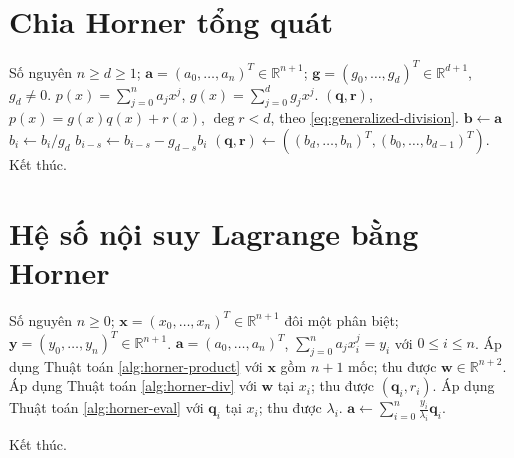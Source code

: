\documentclass[12pt,a4paper,oneside]{book}
\numberwithin{algorithm}{chapter}
\theoremstyle{definition}
\newcommand{\R}{\mathbb{R}}
\begin{document}
\section{Chia Horner tổng quát}
\begin{algorithm}[H]
\caption{Chia đa thức bằng Horner tổng quát}
\label{alg:generalized-horner-div}
\begin{algorithmic}[1]
\Require Số nguyên $n\geq d\geq1$; $\boldsymbol a=(a_0,\ldots,a_n)^T\in\R^{n+1}$; $\boldsymbol g=(g_0,\ldots,g_d)^T\in\R^{d+1}$, $g_d\ne0$. $p(x)=\sum_{j=0}^{n}a_jx^j$, $g(x)=\sum_{j=0}^{d}g_jx^j$.
\Ensure $(\boldsymbol q,\boldsymbol r)$, $p(x)=g(x)q(x)+r(x)$, $\deg r<d$, theo \eqref{eq:generalized-division}.
\State $\boldsymbol b\gets\boldsymbol a$
  \State $b_i\gets b_i/g_d$
    \State $b_{i-s}\gets b_{i-s}-g_{d-s}b_i$
  \EndFor
\EndFor
\Statex
\State $(\boldsymbol q,\boldsymbol r)\gets((b_d,\ldots,b_n)^T,(b_0,\ldots,b_{d-1})^T)$.
\State Kết thúc.
\end{algorithmic}
\end{algorithm}

\section{Hệ số nội suy Lagrange bằng Horner}
\begin{algorithm}[H]
\caption{Tạo hệ số nội suy Lagrange bằng Horner -- sơ lược}
\label{alg:lagrange-coefficients}
\begin{algorithmic}[1]
\Require Số nguyên $n\geq0$; $\boldsymbol x=(x_0,\ldots,x_n)^T\in\R^{n+1}$ đôi một phân biệt; $\boldsymbol y=(y_0,\ldots,y_n)^T\in\R^{n+1}$.
\Ensure $\boldsymbol a=(a_0,\ldots,a_n)^T$, $\sum_{j=0}^{n}a_jx_i^j=y_i$ với $0\leq i\leq n$.
\State Áp dụng Thuật toán \ref{alg:horner-product} với $\boldsymbol x$ gồm $n+1$ mốc; thu được $\boldsymbol w\in\R^{n+2}$.
  \State Áp dụng Thuật toán \ref{alg:horner-div} với $\boldsymbol w$ tại $x_i$; thu được $(\boldsymbol q_i,r_i)$.
  \State Áp dụng Thuật toán \ref{alg:horner-eval} với $\boldsymbol q_i$ tại $x_i$; thu được $\lambda_i$.
\EndFor
\Statex
\State $\displaystyle\boldsymbol a\gets\sum_{i=0}^{n}\frac{y_i}{\lambda_i}\boldsymbol q_i$.

\State Kết thúc.
\end{algorithmic}
\end{algorithm}
\end{document}
